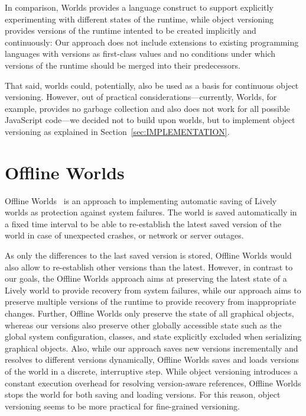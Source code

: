 In comparison, Worlds provides a language construct to support explicitly experimenting with different states of the runtime, while object versioning provides versions of the runtime intented to be created implicitly and continuously: Our approach does not include extensions to existing programming languages with versions as first-class values and no conditions under which versions of the runtime should be merged into their predecessors.

That said, worlds could, potentially, also be used as a basis for continuous object versioning.
However, out of practical considerations---currently, Worlds, for example, provides no garbage collection and also does not work for all possible JavaScript code---we decided not to build upon worlds, but to implement object versioning as explained in Section~\ref{sec:IMPLEMENTATION}.



\section{Offline Worlds}

Offline Worlds~\cite{Czuchra2012OfW} is an approach to implementing automatic saving of Lively worlds as protection against system failures.
The world is saved automatically in a fixed time interval to be able to re-establish the latest saved version of the world in case of unexpected crashes, or network or server outages.

As only the differences to the last saved version is stored, Offline Worlds would also allow to re-establish other versions than the latest.
However, in contrast to our goals, the Offline Worlds approach aims at preserving the latest state of a Lively world to provide recovery from system failures, while our approach aims to preserve multiple versions of the runtime to provide recovery from inappropriate changes.
Further, Offline Worlds only preserve the state of all graphical objects, whereas our versions also preserve other globally accessible state such as the global system configuration, classes, and state explicitly excluded when serializing graphical objects.
Also, while our approach saves new versions incrementally and resolves to different versions dynamically, Offline Worlds saves and loads versions of the world in a discrete, interruptive step.
While object versioning introduces a constant execution overhead for resolving version-aware references, Offline Worlds stops the world for both saving and loading versions.
For this reason, object versioning seems to be more practical for fine-grained versioning.



